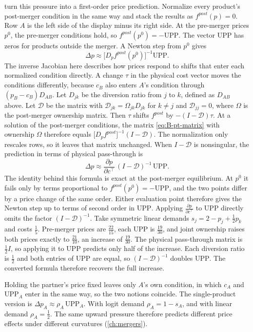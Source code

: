 \begin{remark}
\citet{JaffeWeyl2013} turn this pressure into a first-order price prediction. Normalize every product's post-merger
condition in the same way and stack the results as $f^{post}(p) = 0$. Row $A$ is the left side of the display minus
its right side. At the pre-merger prices $p^0$, the pre-merger conditions hold, so $f^{post}(p^0) = -\mathrm{UPP}$. The vector
$\mathrm{UPP}$ has zeros for products outside the merger. A Newton step from $p^0$ gives
\begin{equation*}
\Delta p \approx \big[D_pf^{post}(p^0)\big]^{-1}\mathrm{UPP} .
\end{equation*}
The inverse Jacobian here describes how prices respond to shifts that enter each normalized condition directly.
A change $\tau$ in the physical cost vector moves the conditions differently, because $c_B$ also enters $A$'s
condition through $(p_B - c_B)D_{AB}$. Let $D_{jk}$ be the diversion ratio from $j$ to $k$, defined as $D_{AB}$ above. Let
$\mathcal{D}$ be the matrix with $\mathcal{D}_{jk} = \Omega_{jk}D_{jk}$ for $k \neq j$ and $\mathcal{D}_{jj} = 0$, where $\Omega$ is
the post-merger ownership matrix. Then $\tau$ shifts $f^{post}$ by
$-(I - \mathcal{D})\tau$. At a solution of the post-merger conditions, the matrix \eqref{eq:B-pt-matrix} with
ownership $\Omega$ therefore equals $\big[D_pf^{post}\big]^{-1}(I - \mathcal{D})$. The normalization only rescales
rows, so it leaves that matrix unchanged. When $I - \mathcal{D}$ is nonsingular, the prediction in terms of physical
pass-through is
\begin{equation*}
\Delta p \approx \frac{\partial p}{\partial c^\top}\,(I - \mathcal{D})^{-1}\,\mathrm{UPP} .
\end{equation*}
The identity behind this formula is exact at the post-merger equilibrium. At $p^0$ it fails only by terms
proportional to $f^{post}(p^0) = -\mathrm{UPP}$, and the two points differ by a price change of the same order. Either
evaluation point therefore gives the Newton step up to terms of second order in $\mathrm{UPP}$.
Applying $\frac{\partial p}{\partial c^\top}$ to $\mathrm{UPP}$ directly omits the factor $(I - \mathcal{D})^{-1}$. Take
symmetric linear demands $s_j = 2 - p_j + \frac{1}{2}p_k$ and costs $\frac{1}{5}$. Pre-merger prices are $\frac{22}{15}$, each
$\mathrm{UPP}$ is $\frac{19}{30}$, and joint ownership raises both prices exactly to $\frac{21}{10}$, an increase of
$\frac{19}{30}$. The physical pass-through matrix is $\frac{1}{2}I$, so applying it to $\mathrm{UPP}$ predicts only half of
the increase. Each diversion ratio is $\frac{1}{2}$ and both entries of $\mathrm{UPP}$ are equal, so $(I -
\mathcal{D})^{-1}$ doubles $\mathrm{UPP}$. The converted formula therefore recovers the full increase.

Holding the partner's price fixed leaves only $A$'s own condition, in which $c_A$ and $\mathrm{UPP}_A$ enter in the same
way, so the two notions coincide. The
single-product version is $\Delta p_A \approx \rho_A\,\mathrm{UPP}_A$. With logit demand $\rho_A = 1 - s_A$, and with
linear demand $\rho_A = \frac{1}{2}$. The same upward pressure therefore predicts different price effects under different
curvatures (\cref{ch:mergers}).
\end{remark}

